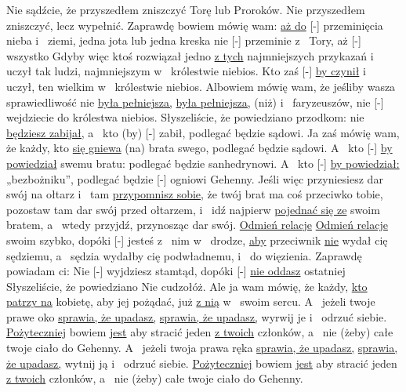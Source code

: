  Nie sądźcie, że przyszedłem zniszczyć Torę lub Proroków. Nie przyszedłem zniszczyć, lecz wypełnić.
 Zaprawdę bowiem mówię wam: \underline{aż do} [-] przeminięcia nieba i~ ziemi, jedna jota lub jedna kreska nie [-] przeminie z~ Tory, aż [-] wszystko 
 Gdyby więc ktoś rozwiązał jedno \underline{z tych} najmniejszych przykazań i~ uczył tak ludzi, najmniejszym  w~ królestwie niebios. Kto zaś [-] \underline{by czynił} i~ uczył, ten wielkim  w~ królestwie niebios.
 Albowiem mówię wam, że jeśliby wasza sprawiedliwość nie \underline{była pełniejsza,} \underline{była pełniejsza,} (niż)  i~ faryzeuszów, nie [-] wejdziecie do królestwa niebios.
 Słyszeliście, że powiedziano przodkom: nie \underline{będziesz zabijał,} a~ kto (by) [-] zabił, podlegać będzie sądowi.
 Ja zaś mówię wam, że każdy, kto \underline{się gniewa}  (na) brata swego, podlegać będzie sądowi. A~ kto [-] \underline{by powiedział} swemu bratu:  podlegać będzie sanhedrynowi. A~ kto [-] \underline{by powiedział:} „bezbożniku”, podlegać będzie [-] ogniowi Gehenny.
 Jeśli więc przyniesiesz dar swój na ołtarz i~ tam \underline{przypomnisz sobie,} że twój brat ma coś przeciwko tobie,
 pozostaw tam dar swój przed ołtarzem, i~ idź najpierw \underline{pojednać się ze} swoim bratem, a~ wtedy przyjdź, przynosząc dar swój.
 \underline{Odmień relacje} \underline{Odmień relacje}  swoim szybko, dopóki [-] jesteś z~ nim w~ drodze, \underline{aby} przeciwnik \underline{nie} wydał cię sędziemu, a~ sędzia wydałby cię podwładnemu, i~  do więzienia.
 Zaprawdę powiadam ci: Nie [-] wyjdziesz stamtąd, dopóki [-] \underline{nie oddasz} ostatniej 
 Słyszeliście, że powiedziano Nie cudzołóż.
 Ale ja wam mówię, że każdy, \underline{kto patrzy na} kobietę, aby jej pożądać, już  \underline{z nią}  w~ swoim sercu.
 A~ jeżeli twoje prawe oko \underline{sprawia, że upadasz,} \underline{sprawia, że upadasz,} wyrwij je i~ odrzuć  siebie. \underline{Pożyteczniej} bowiem \underline{jest}  aby stracić jeden \underline{z twoich} członków, a~ nie (żeby) całe twoje ciało  do Gehenny.
 A~ jeżeli twoja prawa ręka \underline{sprawia, że upadasz,} \underline{sprawia, że upadasz,} wytnij ją i~ odrzuć  siebie. \underline{Pożyteczniej} bowiem \underline{jest}  aby stracić jeden \underline{z twoich} członków, a~ nie (żeby) całe twoje ciało  do Gehenny.
